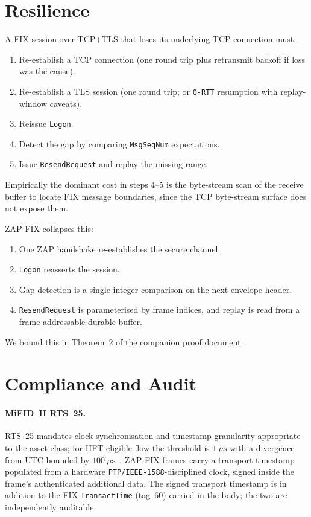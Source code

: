 \documentclass[11pt,a4paper]{article}
\begin{document}
\section{Resilience}
\label{sec:resilience}

A FIX session over TCP+TLS that loses its underlying TCP connection
must:
\begin{enumerate}
  \item Re-establish a TCP connection (one round trip plus retransmit
        backoff if loss was the cause).
  \item Re-establish a TLS session (one round trip; or
        \texttt{0-RTT} resumption with replay-window caveats).
  \item Reissue \texttt{Logon}.
  \item Detect the gap by comparing \texttt{MsgSeqNum} expectations.
  \item Issue \texttt{ResendRequest} and replay the missing range.
\end{enumerate}
Empirically the dominant cost in steps 4--5 is the byte-stream scan
of the receive buffer to locate FIX message boundaries, since the
TCP byte-stream surface does not expose them.

ZAP-FIX collapses this:
\begin{enumerate}
  \item One ZAP handshake re-establishes the secure channel.
  \item \texttt{Logon} reasserts the session.
  \item Gap detection is a single integer comparison on the next
        envelope header.
  \item \texttt{ResendRequest} is parameterised by frame indices,
        and replay is read from a frame-addressable durable buffer.
\end{enumerate}
We bound this in Theorem~2 of the companion proof document.

\section{Compliance and Audit}
\label{sec:compliance}

\paragraph{MiFID~II RTS~25.}
RTS~25 mandates clock synchronisation and timestamp granularity
appropriate to the asset class; for HFT-eligible flow the threshold
is $1~\mu\mathrm{s}$ with a divergence from UTC bounded by
$100~\mu\mathrm{s}$~\cite{rts25}. ZAP-FIX frames carry a transport
timestamp populated from a hardware \texttt{PTP/IEEE-1588}-disciplined
clock, signed inside the frame's authenticated additional data. The
signed transport timestamp is in addition to the FIX
\texttt{TransactTime} (tag~60) carried in the body; the two are
independently auditable.
\end{document}
